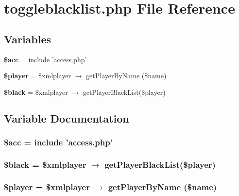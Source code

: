 \section{toggleblacklist.php File Reference}
\label{toggleblacklist_8php}


\subsection*{Variables}
\begin{CompactItemize}
\item 
{\bf \$acc} = include 'access.php'
\item 
{\bf \$player} = \$xmlplayer $\rightarrow$ get\-Player\-By\-Name (\$name)
\item 
{\bf \$black} = \$xmlplayer $\rightarrow$ get\-Player\-Black\-List(\$player)
\end{CompactItemize}


\subsection{Variable Documentation}
\subsubsection{\setlength{\rightskip}{0pt plus 5cm}\$acc = include 'access.php'}\label{toggleblacklist_8php_542926c588a05eb69553d79c83cf73da}


\subsubsection{\setlength{\rightskip}{0pt plus 5cm}\$black = \$xmlplayer $\rightarrow$ get\-Player\-Black\-List(\$player)}\label{toggleblacklist_8php_8d5c4c3c8fca62bcad71c449772fa0c7}


\subsubsection{\setlength{\rightskip}{0pt plus 5cm}\$player = \$xmlplayer $\rightarrow$ get\-Player\-By\-Name (\$name)}\label{toggleblacklist_8php_b3e8b8a040d140eeafa4907e25af9360}


